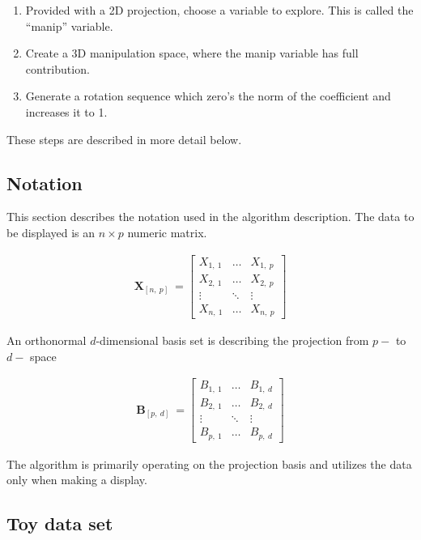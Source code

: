 \documentclass{monashthesis}
\begin{document}
\begin{enumerate}
\def\labelenumi{\arabic{enumi}.}
\tightlist
\item
  Provided with a 2D projection, choose a variable to explore. This is
  called the ``manip'' variable.
\item
  Create a 3D manipulation space, where the manip variable has full
  contribution.
\item
  Generate a rotation sequence which zero's the norm of the coefficient
  and increases it to 1.
\end{enumerate}

These steps are described in more detail below.

\subsection{Notation}\label{notation-1}

This section describes the notation used in the algorithm description.
The data to be displayed is an \(n \times p\) numeric matrix.

\begin{align*}
  \textbf{X}_{[n,~p]} ~=
  \begin{bmatrix}
    X_{1,~1} & \dots  & X_{1,~p} \\
    X_{2,~1} & \dots  & X_{2,~p} \\
    \vdots   & \ddots & \vdots   \\
    X_{n,~1} & \dots  & X_{n,~p}
  \end{bmatrix}
\end{align*}

An orthonormal \(d\)-dimensional basis set is describing the projection
from \(p-\) to \(d-\) space

\begin{align*}
  \textbf{B}_{[p,~d]} ~=
  \begin{bmatrix}
    B_{1,~1} & \dots  & B_{1,~d} \\
    B_{2,~1} & \dots  & B_{2,~d} \\
    \vdots   & \ddots & \vdots   \\
    B_{p,~1} & \dots  & B_{p,~d}
  \end{bmatrix}
\end{align*}

The algorithm is primarily operating on the projection basis and
utilizes the data only when making a display.

\subsection{Toy data set}\label{toy-data-set-1}
\end{document}
